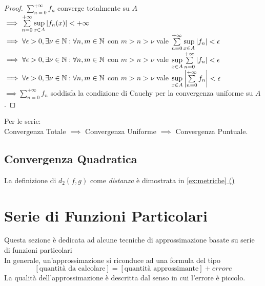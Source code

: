 \begin{proof}
	$\sum\limits_{n=0}^{+\infty}f_n$ converge totalmente su $A$\\
	$\implies \sum\limits_{n=0}^{+\infty}\sup\limits_{x\in A}\left|f_n(x)\right|<+\infty$\\
	$\implies \forall\epsilon>0, \exists\nu\in\mathbb{N}: \forall n,m\in\mathbb{N}$ con $m>n>\nu$ vale $\sum\limits_{n=0}^{+\infty}\sup\limits_{x\in A}\left|f_n\right|<\epsilon$\\
	$\implies \forall\epsilon>0, \exists\nu\in\mathbb{N}: \forall n,m\in\mathbb{N}$ con $m>n>\nu$ vale $\sup\limits_{x\in A}\sum\limits_{n=0}^{+\infty}\left|f_n\right|<\epsilon$\\
	$\implies \forall\epsilon>0, \exists\nu\in\mathbb{N}: \forall n,m\in\mathbb{N}$ con $m>n>\nu$ vale $\sup\limits_{x\in A}\left|\sum\limits_{n=0}^{+\infty}f_n\right|<\epsilon$\\
	$\implies \sum\limits_{n=0}^{+\infty}f_n$ soddisfa la condizione di Cauchy per la convergenza uniforme su $A$.
\end{proof}
\observation
Per le serie:\\
Convergenza Totale $\implies$ Convergenza Uniforme $\implies$ Convergenza Puntuale.
\subsection{Convergenza Quadratica}\label{sect:conv_quadr}
\begin{proposition}
	\label{def:dist_quadratica}

	La definizione di $d_2(f,g)$ come \textit{distanza} è dimostrata in \hyperref[ex:dim_dist_quadratica]{\cref*{ex:metriche} ()}
\end{proposition}
\begin{proposition}
	\label{prop:dist_quad_sp_metr_non_compl}
\end{proposition}

\newpage
\section{Serie di Funzioni Particolari}\label{sect:ser_funz_particol}
Questa sezione è dedicata ad alcune tecniche di approssimazione  basate su serie di funzioni particolari\\
In generale, un'approssimazione si riconduce ad una formula del tipo
\[\left[\text{quantità da calcolare}\right]=\left[\text{quantità approssimante}\right]+ errore\]
La qualità dell'approssimazione è descritta dal senso in cui l'errore è piccolo.
